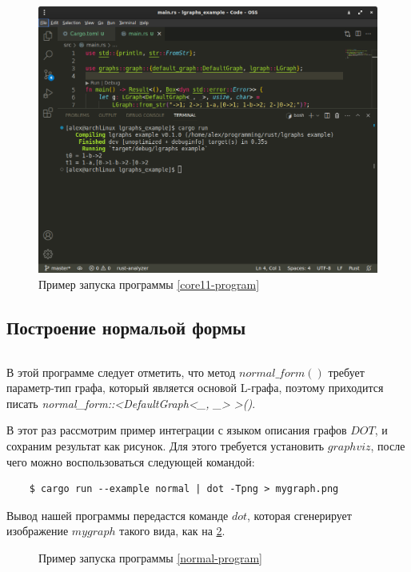 \begin{figure}
    \centering
    \includegraphics[scale=0.4]{static_images/install_step6.png}
    \caption{Пример запуска программы \ref{core11-program}}
    \label{core11-out-image}
\end{figure}

\subsection{Построение нормальой формы}
\inputminted[linenos]{rust}{../lgraphs/examples/normal.rs} \label{normal-program}

В этой программе следует отметить, что метод $normal\_form()$ требует параметр-тип графа, который является основой
L-графа, поэтому приходится писать \emph{normal\_form::<DefaultGraph<\_, \_> >()}.

В этот раз рассмотрим пример интеграции с языком описания графов $DOT$, и сохраним результат как рисунок.
Для этого требуется установить $graphviz$, после чего можно воспользоваться следующей командой:
\begin{verbatim}
    $ cargo run --example normal | dot -Tpng > mygraph.png
\end{verbatim}

Вывод нашей программы передастся команде $dot$, которая сгенерирует изображение $mygraph$ такого вида,
как на \ref{normal-out-image}.

\begin{figure}[h]
    \centering
    
    \caption{Пример запуска программы \ref{normal-program}}
    \label{normal-out-image}
\end{figure}


\pagebreak